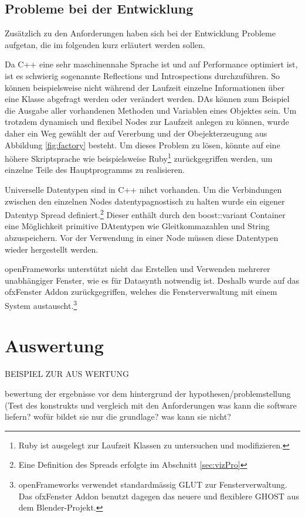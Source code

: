 \documentclass[a4paper, 12pt, DIVcalc, onepage, pdftex, headsepline, footsepline]{scrreprt}
\begin{document}
\section{Probleme bei der Entwicklung}
\label{sec:Probleme}
Zusätzlich zu den Anforderungen haben sich bei der Entwicklung Probleme aufgetan,
die im folgenden kurz erläutert werden sollen.

Da C++ eine sehr maschinennahe Sprache ist und auf Performance optimiert ist,
ist es schwierig sogenannte Reflections und Introspections durchzuführen.
So können beispielsweise nicht während der Laufzeit einzelne Informationen
über eine Klasse abgefragt werden oder verändert werden. DAs können zum Beispiel
die Ausgabe aller vorhandenen Methoden und Variablen eines Objektes sein.
Um trotzdem dynamisch und flexibel Nodes zur Laufzeit anlegen zu können, wurde
daher ein Weg gewählt der auf Vererbung und der Obejekterzeugung aus Abbildung
\ref{fig:factory} besteht. Um dieses Problem zu lösen, könnte auf eine
höhere Skriptsprache wie beispielsweise Ruby\footnote{Ruby ist ausgelegt
zur Laufzeit Klassen zu untersuchen und modifizieren.} zurückgegriffen werden,
um einzelne Teile des Hauptprogramms zu realisieren.

Universelle Datentypen sind in C++ nihct vorhanden. Um die Verbindungen
zwischen den einzelnen Nodes datentypagnostisch zu halten wurde ein
eigener Datentyp Spread definiert.\footnote{Eine Definition des Spreads erfolgte im Abschnitt \ref{sec:vizPro}}
Dieser enthält durch den boost::variant Container eine Möglichkeit primitive DAtentypen
wie Gleitkommazahlen und String abzuspeichern. Vor der Verwendung in einer Node müssen diese
Datentypen wieder hergestellt werden.

openFrameworks unterstützt nicht das Erstellen und Verwenden mehrerer
unabhängiger Fenster, wie es für Datasynth notwendig ist. Deshalb wurde
auf das ofxFenster Addon zurückgegriffen, welches die Fensterverwaltung
mit einem System austauscht.\footnote{openFrameworks verwendet standardmässig GLUT
zur Fensterverwaltung. Das ofxFenster Addon benutzt dagegen das neuere und
flexiblere GHOST aus dem Blender-Projekt.}

\chapter{Auswertung}
\label{cha:Auswertung}

BEISPIEL ZUR AUS WERTUNG

bewertung der ergebnisse vor dem hintergrund der hypothesen/problemstellung (Test des konstrukts und vergleich mit den Anforderungen
was kann die software liefern? wofür bildet sie nur die grundlage? was kann sie nicht?
\end{document}
